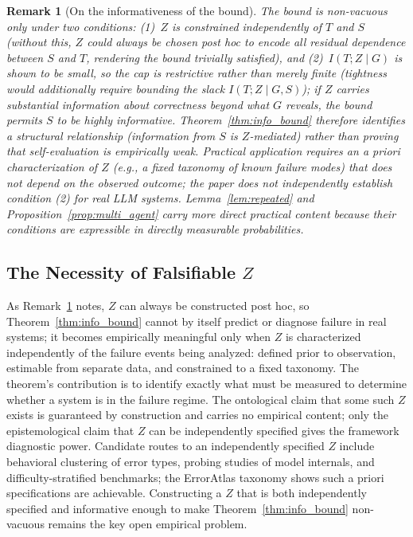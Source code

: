 \documentclass[a4paper,journal]{IAENGtran}
\newtheorem{Remark}[Theorem]{Remark}
\begin{document}
\begin{Remark}[On the informativeness of the bound]
\label{rem:vacuity}
The bound is non-vacuous only under two conditions: (1)~$Z$ is constrained
independently of $T$ and $S$ (without this, $Z$ could always be chosen post hoc to encode
all residual dependence between $S$ and $T$, rendering the bound trivially satisfied), and
(2)~$I(T; Z \mid G)$ is shown to be small, so the cap is restrictive rather than
merely finite (tightness would additionally require bounding the slack
$I(T; Z \mid G, S)$); if $Z$ carries substantial
information about correctness beyond what $G$ reveals, the bound permits $S$ to be highly
informative. Theorem~\ref{thm:info_bound} therefore identifies a structural
relationship (information from $S$ is $Z$-mediated) rather than proving that
self-evaluation is empirically weak. Practical application requires an a priori
characterization of $Z$ (e.g., a fixed taxonomy of known failure modes) that does not
depend on the observed outcome; the paper does not independently establish condition (2)
for real LLM systems. Lemma~\ref{lem:repeated} and Proposition~\ref{prop:multi_agent}
carry more direct practical content because their conditions are expressible in directly
measurable probabilities.
\end{Remark}

\subsection{The Necessity of Falsifiable $Z$}
\label{sec:falsifiable_z}
As Remark~\ref{rem:vacuity} notes, $Z$ can always be constructed post hoc, so
Theorem~\ref{thm:info_bound} cannot by itself predict or diagnose failure in real
systems; it becomes empirically meaningful only when $Z$ is characterized independently
of the failure events being analyzed: defined prior to observation, estimable from
separate data, and constrained to a fixed taxonomy. The theorem's contribution is to
identify exactly what must be measured to determine whether a system is in the failure
regime. The ontological claim that some such $Z$ exists is guaranteed by construction
and carries no empirical content; only the epistemological claim that $Z$ can be
independently specified gives the framework diagnostic power. Candidate routes to an
independently specified $Z$ include behavioral clustering of error types, probing
studies of model internals, and difficulty-stratified benchmarks; the ErrorAtlas
taxonomy shows such a priori specifications are achievable. Constructing a $Z$ that is
both independently specified and informative enough to make
Theorem~\ref{thm:info_bound} non-vacuous remains the key open empirical problem.
\end{document}
